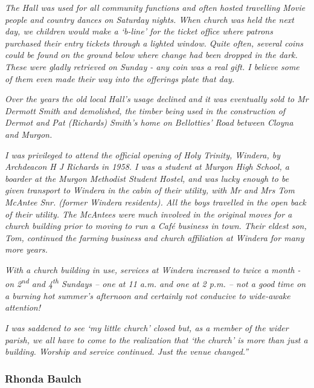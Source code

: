 \emph{The Hall was used for all community functions and often hosted travelling Movie people and country dances on Saturday nights. When church was held the next day, we children would make a `b-line' for the ticket office where patrons purchased their entry tickets through a lighted window. Quite often, several coins could be found on the ground below where change had been dropped in the dark. These were gladly retrieved on Sunday - any coin was a real gift. I believe some of them even made their way into the offerings plate that day.}



\emph{Over the years the old local Hall's usage declined and it was eventually sold to Mr Dermott Smith and demolished, the timber being used in the construction of Dermot and Pat (Richards) Smith's home on Bellotties' Road between Cloyna and Murgon.}



\emph{I was privileged to attend the official opening of Holy Trinity, Windera, by Archdeacon H J Richards in 1958. I was a student at Murgon High School, a boarder at the Murgon Methodist Student Hostel, and was lucky enough to be given transport to Windera in the cabin of their utility, with Mr and Mrs Tom McAntee Snr. (former Windera residents). All the boys travelled in the open back of their utility. The McAntees were much involved in the original moves for a church building prior to moving to run a Café business in town. Their eldest son, Tom, continued the farming business and church affiliation at Windera for many more years.}



\emph{With a church building in use, services at Windera increased to twice a month - on 2\textsuperscript{nd} and 4\textsuperscript{th} Sundays -- one at 11 a.m. and one at 2 p.m. -- not a good time on a burning hot summer's afternoon and certainly not conducive to wide-awake attention!}



\emph{I was saddened to see `my little church' closed but, as a member of the wider parish, we all have to come to the realization that `the church' is more than just a building. Worship and service continued. Just the venue changed.''}



\subsubsection{Rhonda Baulch}



